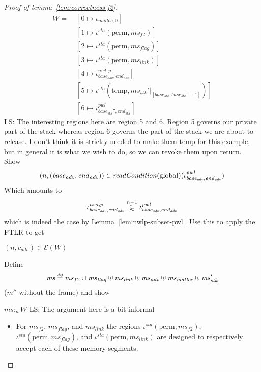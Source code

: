 \documentclass[a4paper]{article}
\newcommand{\defeq}{\stackrel{\textit{\tiny{def}}}{=}}
\newcommand\subsetsim{\mathrel{\ooalign{\raise.2ex\hbox{$\subset$}\cr
      \hidewidth\lower.8ex\hbox{\scalebox{0.9}{$\sim$}}\hidewidth\cr}}}
\newcommand{\nsubsim}[1][n]{\stackrel{\tiny{#1}}{\subsetsim}}
\newcommand\lau[1]{{\color{purple} \sf \footnotesize {LS: #1}}\\}
\newcommand{\var}[1]{\mathit{#1}}
\newcommand{\hs}{\var{ms}}
\newcommand{\ms}{\hs}
\newcommand{\start}{\var{base}}
\newcommand{\addrend}{\var{end}}
\newcommand{\heap}{\var{mem}}
\newcommand{\adv}{\var{adv}}
\newcommand{\link}{\var{link}}
\newcommand{\stk}{\var{stk}}
\newcommand{\flag}{\var{flag}}
\newcommand{\nwl}{\var{nwl}}
\newcommand{\pwl}{\var{pwl}}
\newcommand{\sta}{\var{sta}}
\newcommand{\plainfun}[2]{
  \ifthenelse{\equal{#2}{}}
  {\mathit{#1}}
  {\mathit{#1}(#2)}
}
\newcommand{\readCond}[1]{\plainfun{readCondition}{#1}}
\newcommand{\heapSat}[3][\heap]{#1 :_{#2} #3}
\newcommand{\codelabel}[1]{\mathit{#1}}
\newcommand{\malloc}{\codelabel{malloc}}
\newcommand{\asmType}{\plaindom{AsmType}}
\newcommand{\plaindom}[1]{\mathrm{#1}}
\newcommand{\intr}[2]{\mathcal{#1}}
\newcommand{\exprintr}[1]{\intr{E}{#1}}
\newcommand{\stder}{\exprintr{\asmType}}
\newcommand{\npair}[2][n]{\left(#1,#2 \right)}
\newcommand{\plainperm}[1]{\mathrm{#1}}
\newcommand{\glob}{\plainperm{global}}
\newcommand{\plainview}[1]{\mathrm{#1}}
\newcommand{\perma}{\plainview{perm}}
\newcommand{\temp}{\plainview{temp}}
\begin{document}
\begin{proof}[Proof of lemma~\ref{lem:correctness-f2}]
\begin{align*}
                  W = \;& [0 \mapsto \iota_{\malloc,0}] \\
                        & [1 \mapsto \iota^\sta(\perma,\ms_{f2})]\\ 
                        & [2 \mapsto \iota^\sta (\perma,\ms_\flag)]\\
                        & [3 \mapsto \iota^\sta (\perma,\ms_\link)]\\
                        & [4 \mapsto \iota^{\nwl,p}_{\start_\adv,\addrend_\adv}]\\
                        & [5 \mapsto \iota^\sta (\temp,\ms_\stk'|_{[\start_\stk,\start_\stk''-1]})] \\
                        & [6 \mapsto \iota^\pwl_{\start_\stk'', \addrend_\stk}]
                \end{align*}
                \lau{The interesting regions here are region 5 and 6. Region 5 governs our private part of the stack whereas region 6 governs the part of the stack we are about to release. I don't think it is strictly needed to make them $\temp$ for this example, but in general it is what we wish to do, so we can revoke them upon return.}
                Show
                \[
                  \npair{(\start_\adv,\addrend_\adv)}\in\readCond{}(\glob)(\iota^\pwl_{\start_\adv,\addrend_\adv})
                \]
                Which amounts to
                \[
                  \iota^{\nwl,p}_{\start_\adv,\addrend_\adv} \nsubsim[n-1] \iota^\pwl_{\start_\adv,\addrend_\adv}
                \]
                which is indeed the case by Lemma~\ref{lem:nwlp-subset-pwl}. Use this to apply the FTLR to get 
                \begin{enumproof}
                \item $\npair{c_\adv} \in \stder(W)$ \label{lem:f2-adv-er}
                \end{enumproof}
                Define
                \[
                  \ms  \defeq \hs_{f2} \uplus 
                  \hs_\flag \uplus                
                  \ms_\link \uplus 
                  \hs_\adv \uplus 
                  \ms_\malloc \uplus 
                  \ms_\stk'
                \]
                ($m''$ without the frame) and show
                \begin{enumproof}[resume]
                \item $\heapSat[\ms]{n}{W}$ \label{lem:f2-mem-sat}\lau{The argument here is a bit informal}
                  \begin{itemize}
                  \item For $\hs_{f2}$, $\hs_\flag$, and $\ms_\link$ the regions $\iota^\sta(\perma,\ms_{f2})$,$\iota^\sta (\perma,\ms_\flag)$, and $\iota^\sta (\perma,\ms_\link)$ are designed to respectively accept each of these memory segments.

\end{itemize}
\end{enumproof}
\end{proof}
\end{document}
